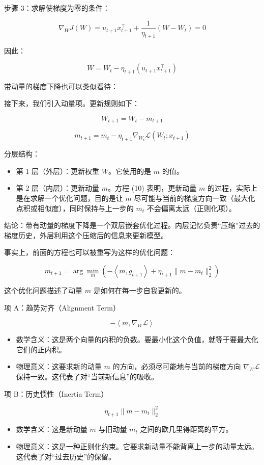 步骤 3：求解使梯度为零的条件：

\[
\nabla_W J(W)=u_{t+1}x_{t+1}^{\top}+\frac{1}{\eta_{t+1}}(W-W_t)=0
\]

因此：

\[
W=W_t-\eta_{t+1}(u_{t+1}x_{t+1}^{\top})
\]

带动量的梯度下降也可以类似看待：

接下来，我们引入动量项。更新规则如下：

\[
W_{t+1}=W_t-m_{t+1}
\tag{7}
\]

\[
m_{t+1}=m_t-\eta_{t+1}\nabla_{W_t}\mathcal{L}(W_t;x_{t+1})
\tag{8}
\]

分层结构：

\begin{itemize}
\tightlist
\item
  第 1 层（外层）：更新权重 \(W\)。它使用的是 \(m\) 的值。
\item
  第 2 层（内层）：更新动量 \(m\)。方程 (10) 表明，更新动量 \(m\) 的过程，实际上是在求解一个优化问题，目的是让 \(m\) 尽可能与当前的梯度方向一致（最大化点积或相似度），同时保持与上一步的 \(m_t\) 不会偏离太远（正则化项）。
\end{itemize}

结论：带有动量的梯度下降是一个双层嵌套优化过程。内层记忆负责``压缩''过去的梯度历史，外层利用这个压缩后的信息来更新模型。

事实上，前面的方程也可以被重写为这样的优化问题：

\[
m_{t+1}=\arg\min_m\left(
-\left\langle m,g_{t+1}\right\rangle
+\eta_{t+1}\lVert m-m_t\rVert_2^2
\right)
\tag{10}
\]

这个优化问题描述了动量 \(m\) 是如何在每一步自我更新的。

项 A：趋势对齐（Alignment Term）

\[
-\left\langle m,\nabla_W\mathcal{L}\right\rangle
\]

\begin{itemize}
\tightlist
\item
  数学含义：这是两个向量的内积的负数。要最小化这个负值，就等于要最大化它们的正内积。
\item
  物理意义：这要求新的动量 \(m\) 的方向，必须尽可能地与当前的梯度方向 \(\nabla_W\mathcal{L}\) 保持一致。这代表了对``当前新信息''的吸收。
\end{itemize}

项 B：历史惯性（Inertia Term）

\[
\eta_{t+1}\lVert m-m_t\rVert_2^2
\]

\begin{itemize}
\tightlist
\item
  数学含义：这是新动量 \(m\) 与旧动量 \(m_t\) 之间的欧几里得距离的平方。
\item
  物理意义：这是一种正则化约束。它要求新动量不能背离上一步的动量太远。这代表了对``过去历史''的保留。
\end{itemize}

